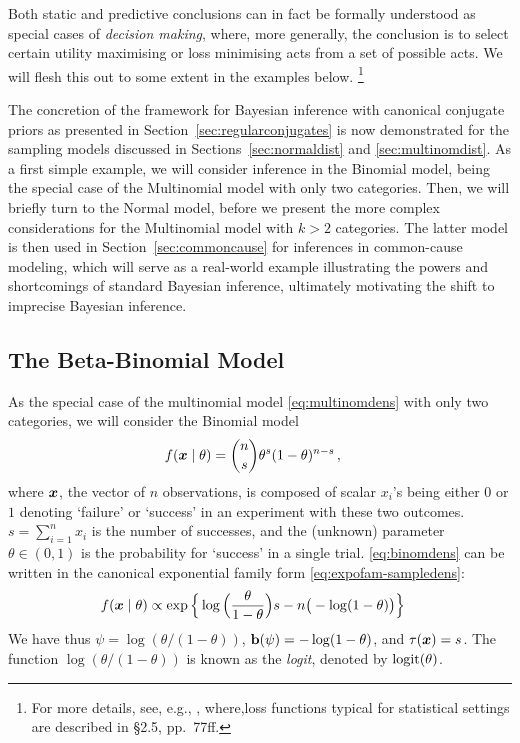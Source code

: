 Both static and predictive conclusions can in fact be formally understood as special cases of \emph{decision making},
where, more generally, the conclusion is to select certain utility maximising or loss minimising acts from a set of possible acts.
We will flesh this out to some extent in the examples below.%
\footnote{For more details, see, e.g., \textcite[\S 2]{2007:robert},
where,loss functions typical for statistical settings are described in \S 2.5, pp.~77ff.}

\medskip

The concretion of the framework for Bayesian inference with canonical conjugate priors
as presented in Section~\ref{sec:regularconjugates}
is now demonstrated for the sampling models discussed in Sections~\ref{sec:normaldist} and \ref{sec:multinomdist}.
As a first simple example, we will consider inference in the Binomial model,
being the special case of the Multinomial model with only two categories.
Then, we will briefly turn to the Normal model,
before we present the more complex considerations for the Multinomial model with $k>2$ categories.
The latter model %
is then used in Section~\ref{sec:commoncause} for inferences in common-cause modeling,
which will serve as a real-world example illustrating the powers and shortcomings of standard Bayesian inference,
ultimately motivating the shift to imprecise Bayesian inference.


\subsection{The Beta-Binomial Model}
\label{sec:beta-binom}

As the special case of the multinomial model \eqref{eq:multinomdens} with only two categories, we will consider the Binomial model
\begin{align}
\label{eq:binomdens}
f({\bm x}\mid\theta) &= {n \choose s}\theta^s (1-\theta)^{n-s}\,,
\end{align}
where ${\bm x}$, the vector of $n$ observations, is composed of scalar $x_i$'s being either $0$ or $1$
denoting `failure' or `success' in an experiment with these two outcomes.
$s = \sum_{i=1}^n x_i$ is the number of successes,
and the (unknown) parameter $\theta \in (0,1)$ is the probability for `success' in a single trial.
\eqref{eq:binomdens} can be written in the canonical exponential family form \eqref{eq:expofam-sampledens}:
\begin{align*}
f({\bm x}\mid\theta) &\propto \exp\Big\{ \log\Big(\frac{\theta}{1-\theta}\Big) s - n \big(-\log(1-\theta)\big) \Big\}
\end{align*}
We have thus $\psi = \log(\theta/(1-\theta))$, $\mathbf{b}(\psi) = -\log(1-\theta)$, and $\tau({\bm x}) = s$.
The function $\log(\theta/(1-\theta))$ is known as the \emph{logit}, denoted by $\operatorname{logit}(\theta)$.

